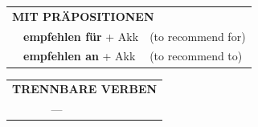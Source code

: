 \documentclass[10pt,a4paper]{revtex4-2}
\begin{document}
\begin{verbbox}
\vspace{10pt}

\begin{tabular}{lll}
\multicolumn{3}{l}{\textbf{MIT PRÄPOSITIONEN}}\\
& \textbf{empfehlen für} + Akk & (to recommend for)\\
& \textbf{empfehlen an} + Akk & (to recommend to)\\
\end{tabular}
\hfill
\begin{tabular}{lll}
\multicolumn{3}{l}{\textbf{TRENNBARE VERBEN}}\\
& ---\\
\end{tabular}
\vspace{-5pt}
\end{verbbox}
\end{document}
